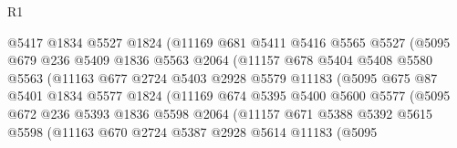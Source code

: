 \begin{lexlean}{R1}
\begin{coremodule}
                          @5417
                          @1834
                          @5527
                          @1824
                          (@11169
                            @681
                            @5411
                            @5416
                            @5565
                            @5527
                            (@5095
                              @679
                              @236
                              @5409
                              @1836
                              @5563
                              @2064
                              (@11157
                                @678
                                @5404
                                @5408
                                @5580
                                @5563
                                (@11163
                                  @677
                                  @2724
                                  @5403
                                  @2928
                                  @5579
                                  @11183
                                  (@5095
                                    @675
                                    @87
                                    @5401
                                    @1834
                                    @5577
                                    @1824
                                    (@11169
                                      @674
                                      @5395
                                      @5400
                                      @5600
                                      @5577
                                      (@5095
                                        @672
                                        @236
                                        @5393
                                        @1836
                                        @5598
                                        @2064
                                        (@11157
                                          @671
                                          @5388
                                          @5392
                                          @5615
                                          @5598
                                          (@11163
                                            @670
                                            @2724
                                            @5387
                                            @2928
                                            @5614
                                            @11183
                                            (@5095

\end{coremodule}
\end{lexlean}
